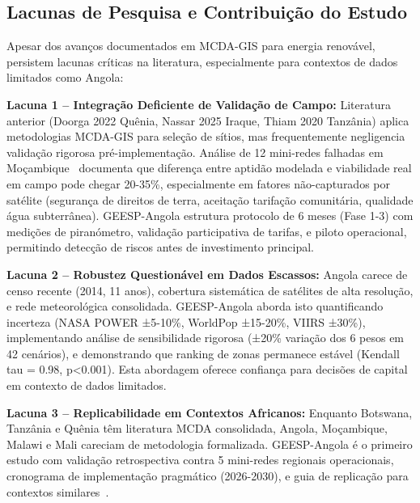 \documentclass[12pt, a4paper]{article}
\begin{document}
\subsection{Lacunas de Pesquisa e Contribuição do Estudo}

Apesar dos avanços documentados em MCDA-GIS para energia renovável, persistem lacunas críticas na literatura, especialmente para contextos de dados limitados como Angola:

\textbf{Lacuna 1 -- Integração Deficiente de Validação de Campo:} Literatura anterior (Doorga 2022 Quênia, Nassar 2025 Iraque, Thiam 2020 Tanzânia) aplica metodologias MCDA-GIS para seleção de sítios, mas frequentemente negligencia validação rigorosa pré-implementação. Análise de 12 mini-redes falhadas em Moçambique~\citep{Ahlborg2014} documenta que diferença entre aptidão modelada e viabilidade real em campo pode chegar 20-35\%, especialmente em fatores não-capturados por satélite (segurança de direitos de terra, aceitação tarifação comunitária, qualidade água subterrânea). GEESP-Angola estrutura protocolo de 6 meses (Fase 1-3) com medições de piranómetro, validação participativa de tarifas, e piloto operacional, permitindo detecção de riscos antes de investimento principal.

\textbf{Lacuna 2 -- Robustez Questionável em Dados Escassos:} Angola carece de censo recente (2014, 11 anos), cobertura sistemática de satélites de alta resolução, e rede meteorológica consolidada. GEESP-Angola aborda isto quantificando incerteza (NASA POWER ±5-10\%, WorldPop ±15-20\%, VIIRS ±30\%), implementando análise de sensibilidade rigorosa (±20\% variação dos 6 pesos em 42 cenários), e demonstrando que ranking de zonas permanece estável (Kendall tau = 0.98, p<0.001). Esta abordagem oferece confiança para decisões de capital em contexto de dados limitados.

\textbf{Lacuna 3 -- Replicabilidade em Contextos Africanos:} Enquanto Botswana, Tanzânia e Quênia têm literatura MCDA consolidada, Angola, Moçambique, Malawi e Mali careciam de metodologia formalizada. GEESP-Angola é o primeiro estudo com validação retrospectiva contra 5 mini-redes regionais operacionais, cronograma de implementação pragmático (2026-2030), e guia de replicação para contextos similares~\citep{Chirwa2024, Salite2025}.
\end{document}
